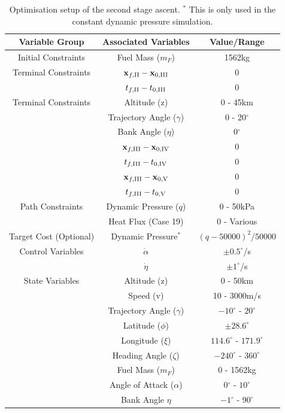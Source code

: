 \begin{table}[ht]
	\centering
	\begin{tabular}{|c|c|c|}
		\hline \textbf{Variable Group}  & \textbf{Associated Variables} & \textbf{Value/Range}\\
		\hline Initial Constraints  & Fuel Mass ($m_F$) & 1562kg\\ 
		Terminal Constraints & $\textbf{x}_{f,\textrm{\rom{2}}} - \textbf{x}_{0,\textrm{\rom{3}}}$ & 0\\ & $t_{f,\textrm{\rom{2}}} - t_{0,\textrm{\rom{3}}}$ & 0\\
		\hline Terminal Constraints & Altitude (z) & 0 - 45km\\ & Trajectory Angle ($\gamma$)& 0 - 20$^\circ$\\  & Bank Angle ($\eta$)& 0$^\circ$\\  & $\textbf{x}_{f,\textrm{\rom{3}}} - \textbf{x}_{0,\textrm{\rom{4}}}$ & 0\\ & $t_{f,\textrm{\rom{3}}} - t_{0,\textrm{\rom{4}}}$ & 0\\
		 & $\textbf{x}_{f,\textrm{\rom{3}}} - \textbf{x}_{0,\textrm{\rom{5}}}$ & 0\\ & $t_{f,\textrm{\rom{3}}} - t_{0,\textrm{\rom{5}}}$ & 0\\
		\hline Path Constraints & Dynamic Pressure ($q$)& 0 - 50kPa\\ & Heat Flux (Case 19) & 0 - Various\\ 
		\hline Target Cost (Optional) & Dynamic Pressure$^*$ & $(q-50000)^2/50000$\\ 
		\hline Control Variables & $\dot{\alpha}$ &  $\pm0.5^\circ$/s\\  & $\dot{\eta}$ &  $\pm1^\circ$/s\\ 
		\hline State Variables & Altitude (z) & 0 - 50km\\ & Speed (v)& 10 - 3000m/s\\ & Trajectory Angle ($\gamma$)& $-10^\circ$ - $20^\circ$\\   & Latitude ($\phi$) &$\pm28.6^\circ$ \\  & Longitude ($\xi$)& $114.6^\circ$ - $171.9^\circ$\\   & Heading Angle ($\zeta$)& $-240^\circ$ - $360^\circ$ \\  & Fuel Mass ($m_F$)& 0 - 1562kg \\  & Angle of Attack ($\alpha$)&  0$^\circ$ - $10^\circ$ \\  & Bank Angle $\eta$& $-1^\circ$ - $90^\circ$ \\  
		\hline 
	\end{tabular} 
	\caption{Optimisation setup of the second stage ascent. $^*$ This is only used in the constant dynamic pressure simulation.}
	\label{tab:SPARTANascentsetup}
\end{table}

